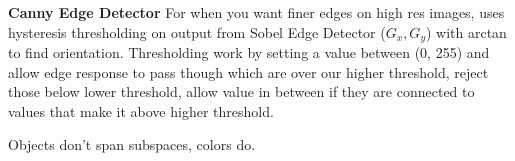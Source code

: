 \documentclass[3pt,landscape]{article}
\makeatletter
\renewcommand{\section}{\@startsection{section}{1}{0mm}{-1ex plus -.5ex minus -.2ex}{0.5ex plus .2ex}{\normalfont\large\bfseries}}
\renewcommand{\subsection}{\@startsection{subsection}{2}{0mm}{-1explus -.5ex minus -.2ex}{0.5ex plus .2ex}{\normalfont\normalsize\bfseries}}
\makeatother
\begin{document}
\begin{multicols}{3}
\textbf{Canny Edge Detector} For when you want finer edges on high res images, uses hysteresis thresholding on output from Sobel Edge Detector ($G_x, G_y$) with arctan to find orientation. Thresholding work by setting a value between (0, 255) and allow edge response to pass though which are over our higher threshold, reject those below lower threshold, allow value in between if they are connected to values that make it above higher threshold. 







Objects don't span subspaces, colors do. 













\end{multicols}
\end{document}
